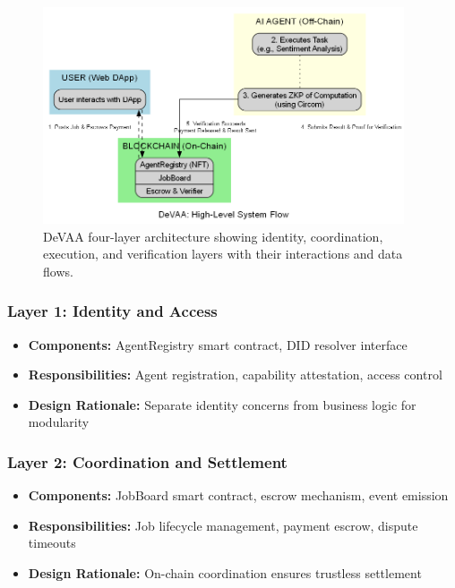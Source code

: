 \begin{figure}[h]
    \centering
    \includegraphics[width=0.95\textwidth]{diagram_DeVAA}
    \caption{DeVAA four-layer architecture showing identity, coordination, execution, and verification layers with their interactions and data flows.}
    \label{fig:devaa-architecture}
\end{figure}

\subsubsection{Layer 1: Identity and Access}
\begin{itemize}
    \item \textbf{Components:} AgentRegistry smart contract, DID resolver interface
    \item \textbf{Responsibilities:} Agent registration, capability attestation, access control
    \item \textbf{Design Rationale:} Separate identity concerns from business logic for modularity
\end{itemize}

\subsubsection{Layer 2: Coordination and Settlement}
\begin{itemize}
    \item \textbf{Components:} JobBoard smart contract, escrow mechanism, event emission
    \item \textbf{Responsibilities:} Job lifecycle management, payment escrow, dispute timeouts
    \item \textbf{Design Rationale:} On-chain coordination ensures trustless settlement
\end{itemize}

